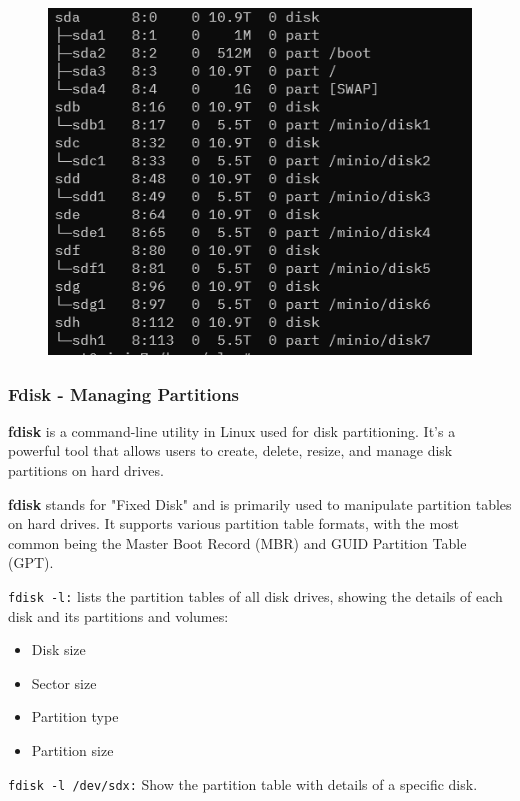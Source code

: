 \documentclass{article}
\begin{document}
\begin{figure}[H]
    \includegraphics[scale=0.7]{pictures/lsblkm.png}
    \centering
\end{figure}

\subsubsection{Fdisk - Managing Partitions}
\textbf{fdisk} is a command-line utility in Linux used for disk partitioning. It's a powerful tool that allows users to create, delete, resize, and manage disk partitions on hard drives.

\textbf{fdisk} stands for "Fixed Disk" and is primarily used to manipulate partition tables on hard drives. It supports various partition table formats, with the most common being the Master Boot Record (MBR) and GUID Partition Table (GPT).

\verb|fdisk -l:| lists the partition tables of all disk drives, showing the details of each disk and its partitions and volumes:
\begin{itemize}
    \item Disk size
    \item Sector size
    \item Partition type
    \item Partition size
\end{itemize}

\verb|fdisk -l /dev/sdx:| Show the partition table with details of a specific disk.
\end{document}

